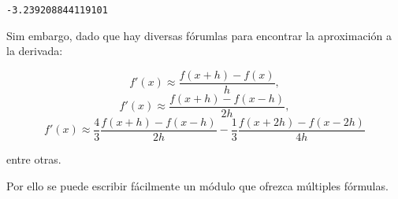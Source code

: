 \begin{code}
\begin{verbatim}
-3.239208844119101
\end{verbatim}

Sim embargo, dado que hay diversas fórumlas para encontrar la
aproximación a la derivada:

\[ f'(x) \approx \dfrac{f(x+h) - f(x)}{h}, \]
\[ f'(x) \approx \dfrac{f(x+h) - f(x-h)}{2h}, \]
\[ f'(x) \approx \dfrac{4}{3}\dfrac{f(x+h)-f(x-h)}{2h} - \dfrac{1}{3}\dfrac{f(x+2h)-f(x-2h)}{4h} \]

entre otras.

Por ello se puede escribir fácilmente un módulo que ofrezca múltiples
fórmulas.

\begin{Shaded}
\begin{Highlighting}[]
     \NormalTok{(}\OperatorTok{=}\NormalTok{):}
        \OperatorTok{=}

     \NormalTok{(}
\OperatorTok{=} 
        \OperatorTok{+}\OperatorTok{{-}}\OperatorTok{/}

     \NormalTok{(}\OperatorTok{=}\NormalTok{):}
        \OperatorTok{=}

     \NormalTok{(}
\OperatorTok{=} 
        \OperatorTok{+}\OperatorTok{{-}}\OperatorTok{{-}}\OperatorTok{/}\OperatorTok{/}

     \NormalTok{(}\OperatorTok{=}\NormalTok{):}
        \OperatorTok{=}


\end{Highlighting}
\end{Shaded}
\end{code}

